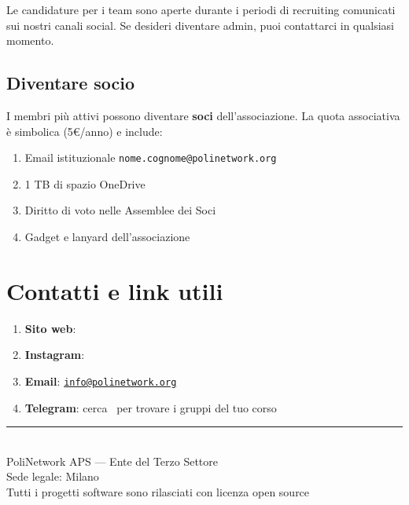 \documentclass[letter]{core/polinetwork}
\begin{document}
Le candidature per i team sono aperte durante i periodi di
recruiting comunicati sui nostri canali social. Se desideri
diventare admin, puoi contattarci in qualsiasi momento.

\subsection{Diventare socio}

I membri più attivi possono diventare \textbf{soci} dell'associazione.
La quota associativa è simbolica (5\euro{}/anno) e include:
\begin{enumerate}[leftmargin=2em]
    \item Email istituzionale \texttt{nome.cognome@polinetwork.org}
    \item 1 TB di spazio OneDrive
    \item Diritto di voto nelle Assemblee dei Soci
    \item Gadget e lanyard dell'associazione
\end{enumerate}

\section{Contatti e link utili}

\begin{enumerate}[leftmargin=2em]
    \item \textbf{Sito web}: \pnWebsiteLink
    \item \textbf{Instagram}: \pnInstagramLink
    \item \textbf{Email}: \href{mailto:info@polinetwork.org}{\textcolor{pn-primary}{\texttt{info@polinetwork.org}}}
    \item \textbf{Telegram}: cerca \pnTelegramLink\ per
          trovare i gruppi del tuo corso
\end{enumerate}

\vspace{2em}

\begin{center}
    \rule{0.3\textwidth}{0.5pt}\\[1em]
    \textcolor{pn-text-secondary}{\small PoliNetwork APS — Ente del Terzo Settore}\\
    \textcolor{pn-text-secondary}{\small Sede legale: Milano}\\
    \textcolor{pn-text-secondary}{\small Tutti i progetti software sono rilasciati con licenza open source}
\end{center}
\end{document}
